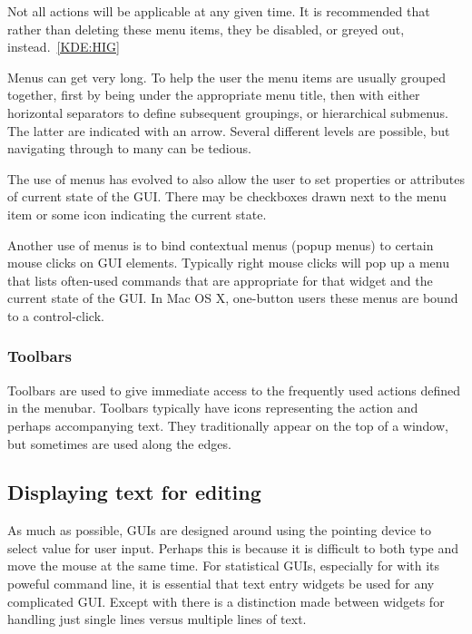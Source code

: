 Not all actions will be applicable at any given time. It is
recommended that rather than deleting these menu items, they be
disabled, or greyed out, instead.~\ref{KDE:HIG}

Menus can get very long. To help the user the menu items are usually
grouped together, first by being under the appropriate menu title,
then with either horizontal separators to define subsequent groupings,
or hierarchical submenus. The latter are indicated with an
arrow. Several different levels are possible, but navigating through
to many can be tedious.

The use of menus has evolved to also allow the user to set properties
or attributes of current state of the GUI. There may be checkboxes
drawn next to the menu item or some icon indicating the current state.

Another use of menus is to bind contextual menus (popup menus) to
certain mouse clicks on GUI elements. Typically right mouse clicks
will pop up a menu that lists often-used commands that are appropriate
for that widget and the current state of the GUI. In Mac OS X,
one-button users these menus are bound to a control-click.

\subsubsection{Toolbars}
\label{sec:GUI:toolbars}

Toolbars are used to give immediate access to the frequently used actions
defined in the menubar. Toolbars typically have icons representing the
action and perhaps accompanying text. They traditionally appear on the
top of a window, but sometimes are used along the edges. 


\subsection{Displaying text for editing}
\label{sec:GUI:text-widgets}

As much as possible, GUIs are designed around using the pointing
device to select value for user input. Perhaps this is because it is
difficult to both type and move the mouse at the same time. For
statistical GUIs, especially for \R\/ with its poweful command line,
it is essential that text entry widgets be used for any complicated
GUI. Except with \wxWidgets\/ there is a distinction made between
widgets for handling just single lines versus multiple lines of text.

